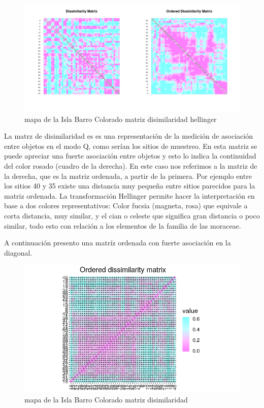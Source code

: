 \documentclass[11pt,]{article}
\begin{document}
\begin{figure}
\centering
\includegraphics[width=1.00000\textwidth]{matriz_disimilaridad_hellinger.png}
\caption{mapa de la Isla Barro Colorado matriz disimilaridad hellinger
\label{fig:bci_map}}
\end{figure}

La matrz de disimilaridad es es una representación de la medición de
asociación entre objetos en el modo Q, como serían los sitios de
muestreo. En esta matriz se puede apreciar una fuerte asociación entre
objetos y esto lo indica la continuidad del color rosado (cuadro de la
derecha). En este caso nos referimos a la matriz de la derecha, que es
la matriz ordenada, a partir de la primera. Por ejemplo entre los sitios
40 y 35 existe una distancia muy pequeña entre sitios parecidos para la
matriz ordenada. La transformación Hellinger permite hacer la
interpretación en base a dos colores representativos: Color fucsia
(magneta, rosa) que equivale a corta distancia, muy similar, y el cian o
celeste que significa gran distancia o poco similar, todo esto con
relación a los elementos de la familia de las moraceae.

A continuación presento una matríz ordenada con fuerte asociación en la
diagonal.

\begin{figure}
\centering
\includegraphics[width=1.00000\textwidth]{matrizdedisimilaridad.png}
\caption{mapa de la Isla Barro Colorado matriz disimilaridad
\label{fig:bci_map}}
\end{figure}
\end{document}
